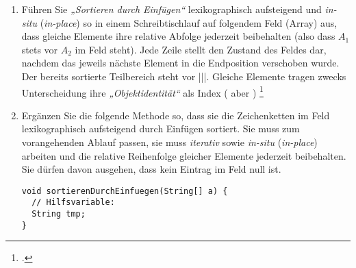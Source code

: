 \documentclass{bschlangaul-aufgabe}
\begin{document}
\begin{enumerate}
\item Führen Sie \emph{„Sortieren durch Einfügen“} lexikographisch
aufsteigend und \emph{in-situ} (\emph{in-place}) so in einem
Schreibtischlauf auf folgendem Feld (Array) aus, dass gleiche Elemente
ihre relative Abfolge jederzeit beibehalten (also dass \zB $A_1$
stets vor $A_2$ im Feld steht). Jede Zeile stellt den Zustand des Feldes
dar, nachdem das jeweils nächste Element in die Endposition verschoben
wurde. Der bereits sortierte Teilbereich steht vor |||. Gleiche Elemente
tragen zwecks Unterscheidung ihre \emph{„Objektidentität“} als Index
(\zB {} aber )
\footcite[Seite 1, Aufgabe 1]{aud:pu:2}

\usetikzlibrary{chains,fit,shapes,shapes.multipart}

\begin{center}
\end{center}

\begin{bAntwort}
\begin{center}





\end{center}
\end{bAntwort}

\item Ergänzen Sie die folgende Methode
so, dass sie die Zeichenketten im Feld  lexikographisch
aufsteigend durch Einfügen sortiert. Sie muss zum vorangehenden Ablauf
passen, \dh sie muss \emph{iterativ} sowie \emph{in-situ}
(\emph{in-place}) arbeiten und die relative Reihenfolge gleicher
Elemente jederzeit beibehalten. Sie dürfen davon ausgehen, dass kein
Eintrag im Feld null ist.

\begin{verbatim}
void sortierenDurchEinfuegen(String[] a) {
  // Hilfsvariable:
  String tmp;
}
\end{verbatim}

\begin{bAntwort}
\end{bAntwort}
\end{enumerate}
\end{document}

